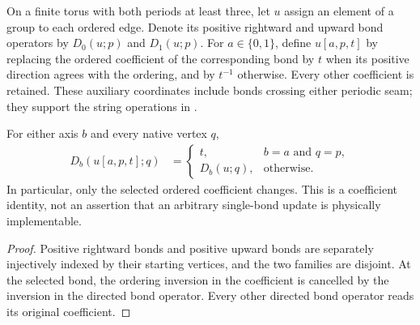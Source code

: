 \begin{definition}%
    \label{def:peps_torus_directed_bond_update}
    \leanok
    On a finite torus with both periods at least three, let $u$ assign an
    element of a group to each ordered edge. Denote its positive rightward
    and upward bond operators by $D_0(u;p)$ and $D_1(u;p)$.
    For $a\in\{0,1\}$, define $u[a,p,t]$ by replacing the ordered coefficient
    of the corresponding bond by $t$ when its positive direction agrees
    with the ordering, and by $t^{-1}$ otherwise. Every other coefficient
    is retained. These auxiliary coordinates include bonds crossing either
    periodic seam; they support the string operations in
    \cite[\S6.6]{Schuch2010PEPS}.
\end{definition}

\begin{lemma}%
    \label{thm:peps_torus_directed_bond_update}
    \leanok
    For either axis $b$ and every native vertex $q$,
    \begin{align}
        D_b(u[a,p,t];q)
         & =\begin{cases}t, & b=a\text{ and }q=p, \\D_b(u;q),&\text{otherwise}.
            \end{cases}
    \end{align}
    In particular, only the selected ordered coefficient changes.
    This is a coefficient identity, not an assertion that an arbitrary
    single-bond update is physically implementable.
\end{lemma}

\begin{proof}\leanok
    Positive rightward bonds and positive upward bonds are separately
    injectively indexed by their starting vertices, and the two families
    are disjoint. At the selected bond, the ordering inversion in the
    coefficient is cancelled by the inversion in the directed bond operator.
    Every other directed bond operator reads its original coefficient.
\end{proof}
